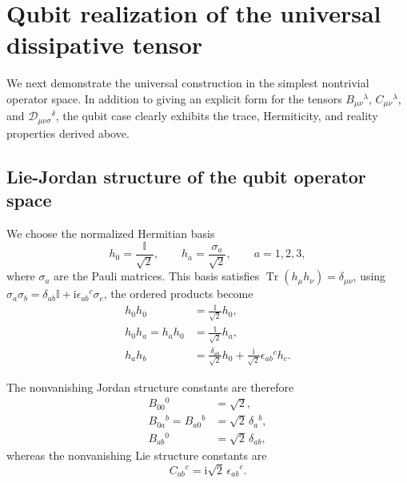 \documentclass[notitlepage,aip,reprint,onecolumn]{revtex4-1}
\theoremstyle{definition}
\begin{document}
\section{Qubit realization of the universal dissipative tensor}\label{Sec:QubitRealization}

We next demonstrate the universal construction in the simplest nontrivial operator space. In addition to giving an explicit form for the tensors \(B_{\mu\nu}{}^\lambda\), \(C_{\mu\nu}{}^\lambda\), and \(\mathcal D_{\mu\nu\sigma}{}^\delta\), the qubit case clearly exhibits the trace, Hermiticity, and reality properties derived above.

\subsection{Lie-Jordan structure of the qubit operator space}

We choose the normalized Hermitian basis
\begin{equation}\label{eq:qubit-HS-basis}
    h_0
    =
    \frac{\mathbb I}{\sqrt2},
    \qquad
    h_a
    =
    \frac{\sigma_a}{\sqrt2},
    \qquad
    a=1,2,3,
\end{equation}
where \(\sigma_a\) are the Pauli matrices. This basis satisfies \(\operatorname{Tr}(h_\mu h_\nu) = \delta_{\mu\nu}\), using \(\sigma_a\sigma_b = \delta_{ab}\mathbb I + \mathrm{i}\epsilon_{ab}{}^c\sigma_c\), the ordered products become
\begin{subequations}\label{eq:qubit-ordered-products}
\begin{align}
    h_0h_0
    &=
    \frac1{\sqrt2}h_0,
    \\
    h_0h_a
    =
    h_ah_0
    &=
    \frac1{\sqrt2}h_a,
    \\
    h_ah_b
    &=
    \frac{\delta_{ab}}{\sqrt2}h_0
    +
    \frac{\mathrm{i}}{\sqrt2}
    \epsilon_{ab}{}^c h_c.
\end{align}
\end{subequations}

The nonvanishing Jordan structure constants are therefore
\begin{subequations}\label{eq:qubit-B-constants}
\begin{align}
    B_{00}{}^0
    &=
    \sqrt2,
    \\
    B_{0a}{}^b
    =
    B_{a0}{}^b
    &=
    \sqrt2\,\delta_a{}^b,
    \\
    B_{ab}{}^0
    &=
    \sqrt2\,\delta_{ab},
\end{align}
\end{subequations}
whereas the nonvanishing Lie structure constants are
\begin{equation}\label{eq:qubit-C-constants}
    C_{ab}{}^c
    =
    \mathrm{i}\sqrt2\,
    \epsilon_{ab}{}^c.
\end{equation}
\end{document}
